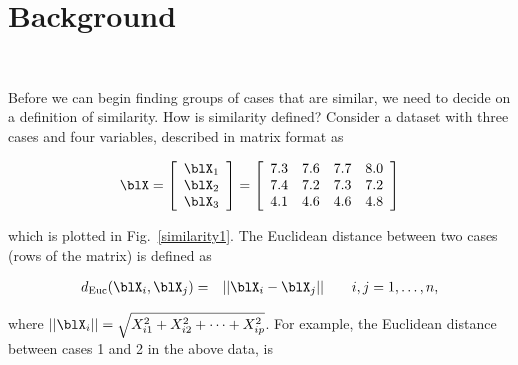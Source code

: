 \section{Background}~\label{clust-bg}

Before we can begin finding groups of cases that are similar, we need
to decide on a definition of similarity.  How is similarity defined?
Consider a dataset with three cases and four variables, described in matrix
format as

\begin{eqnarray*}
\blX = \left[ \begin{array}{c} 
     \blX_1 \\ \blX_2 \\ \blX_3 \\ 
     \end{array} \right] = 
     \left[ \begin{array}{rrrr}
       7.3 & 7.6 & 7.7 & 8.0 \\
       7.4 & 7.2 & 7.3 & 7.2 \\
       4.1 & 4.6 & 4.6 & 4.8 \\
     \end{array} \right]
\end{eqnarray*}

\noindent which is plotted in Fig.~\ref{similarity1}. 
The Euclidean distance between two cases (rows of the matrix) is
defined as

\begin{eqnarray*}
d_{\rm Euc}(\blX_i,\blX_j) &=& ||\blX_i-\blX_j|| %
~~~~~~i,j=1,\dots, n,
\end{eqnarray*}

\noindent where $||\blX_i||=\sqrt{X_{i1}^2+X_{i2}^2+\dots +X_{ip}^2}$.
For example, the Euclidean distance between cases 1 and 2 in the above
data, is

